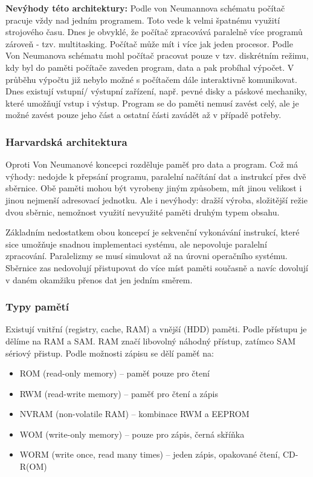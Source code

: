 \textbf{Nevýhody této architektury:} Podle von Neumannova schématu počítač pracuje vždy nad jedním programem. Toto vede k velmi špatnému využití strojového času. Dnes je obvyklé, že počítač zpracovává paralelně více programů zároveň - tzv. multitasking. Počítač může mít i více jak jeden procesor. Podle Von Neumanova schématu mohl počítač pracovat pouze v tzv. diskrétním režimu, kdy byl do paměti počítače zaveden program, data a pak probíhal výpočet. V průběhu výpočtu již nebylo možné s počítačem dále interaktivně komunikovat.
Dnes existují vstupní/ výstupní zařízení, např. pevné disky a páskové mechaniky, které umožňují vstup i výstup. Program se do paměti nemusí zavést celý, ale je možné zavést pouze jeho část a ostatní části zavádět až v případě potřeby.


\subsubsection{Harvardská architektura}
Oproti Von Neumanové koncepci rozděluje paměť pro data a program. Což má výhody: nedojde k přepsání programu, paralelní načítání dat a instrukcí přes dvě sběrnice. Obě paměti mohou být vyrobeny jiným způsobem, mít jinou velikost i jinou nejmenší adresovací jednotku. Ale i nevýhody: dražší výroba, složitější režie dvou sběrnic, nemožnost využití nevyužité paměti druhým typem obsahu.

Základním nedostatkem obou koncepcí je sekvenční vykonávání instrukcí, které sice umožňuje snadnou implementaci systému, ale nepovoluje paralelní zpracování. Paralelizmy se musí simulovat až na úrovni operačního systému. Sběrnice zas nedovolují přistupovat do více míst paměti současně a navíc dovolují v daném okamžiku přenos dat jen jedním směrem.

\subsubsection{Typy pamětí}
Existují vnitřní (registry, cache, RAM) a vnější (HDD) paměti. Podle přístupu je dělíme na RAM a SAM. RAM značí libovolný náhodný přístup, zatímco SAM sériový přistup. Podle možnosti zápisu se dělí paměť na:
\begin{itemize}
\item ROM (read-only memory) -- paměť pouze pro čtení
\item RWM (read-write memory) -- paměť pro čtení a zápis
\item NVRAM (non-volatile RAM) -- kombinace RWM a EEPROM
\item WOM (write-only memory) -- pouze pro zápis, černá skříňka
\item WORM (write once, read many times) -- jeden zápis, opakované čtení, CD-R(OM)
\end{itemize}

